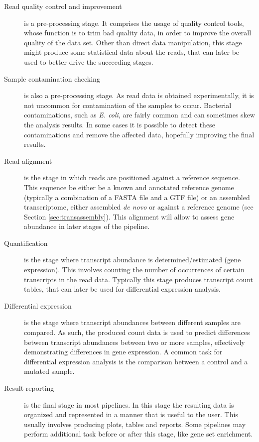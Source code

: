 \begin{description}

  \item[Read quality control and improvement]
  is a pre-processing stage. It comprises the usage of quality control tools,
  whose function is to trim bad quality data, in order to improve the overall
  quality of the data set. Other than direct data manipulation, this stage might
  produce some statistical data about the reads, that can later be used to
  better drive the succeeding stages.

  \item[Sample contamination checking]
  is also a pre-processing stage. As read data is obtained experimentally, it is
  not uncommon for contamination of the samples to occur. Bacterial
  contaminations, such as \emph{E. coli}, are fairly common and can sometimes
  skew the analysis results. In some cases it is possible to detect these
  contaminations and remove the affected data, hopefully improving the final
  results.

  \item[Read alignment]
  is the stage in which reads are positioned against a reference sequence. This
  sequence be either be a known and annotated reference genome (typically a
  combination of a FASTA file and a GTF file) or an assembled transcriptome,
  either assembled \emph{de novo} or against a reference genome (see Section
  \ref{sec:transassembly}). This alignment will allow to assess gene abundance
  in later stages of the pipeline.

  \item[Quantification]
  is the stage where transcript abundance is determined/estimated (gene
  expression). This involves counting the number of occurrences of certain
  transcripts in the read data. Typically this stage produces transcript count
  tables, that can later be used for differential expression analysis.

  \item[Differential expression]
  is the stage where transcript abundances between different samples are
  compared. As such, the produced count data is used to predict differences
  between transcript abundances between two or more samples, effectively
  demonstrating differences in gene expression. A common task for differential
  expression analysis is the comparison between a control and a mutated sample.

  \item[Result reporting]
  is the final stage in most pipelines. In this stage the resulting data is
  organized and represented in a manner that is useful to the user. This usually
  involves producing plots, tables and reports. Some pipelines may perform
  additional task before or after this stage, like gene set enrichment.

\end{description}

